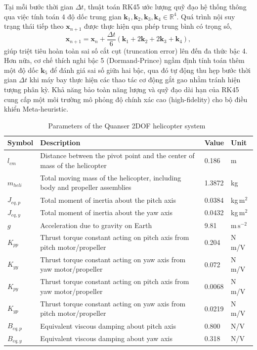\documentclass[conference, a4paper]{IEEEtran}
\begin{document}
Tại mỗi bước thời gian $\Delta t$, thuật toán RK45 ước lượng quỹ đạo hệ thống thông qua việc tính toán 4 độ dốc trung gian $\mathbf{k}_1, \mathbf{k}_2, \mathbf{k}_3, \mathbf{k}_4 \in \mathbb{R}^4$. Quá trình nội suy trạng thái tiếp theo $\mathbf{x}_{n+1}$ được thực hiện qua phép trung bình có trọng số,
\begin{equation}
\mathbf{x}_{n+1} = \mathbf{x}_n + \frac{\Delta t}{6} (\mathbf{k}_1 + 2\mathbf{k}_2 + 2\mathbf{k}_3 + \mathbf{k}_4),
\end{equation}
giúp triệt tiêu hoàn toàn sai số cắt cụt (truncation error) lên đến đa thức bậc 4. Hơn nữa, cơ chế thích nghi bậc 5 (Dormand-Prince) ngầm định tính toán thêm một độ dốc $\mathbf{k}_5$ để đánh giá sai số giữa hai bậc, qua đó tự động thu hẹp bước thời gian $\Delta t$ khi máy bay thực hiện các thao tác cơ động gắt gao nhằm tránh hiện tượng phân kỳ. Khả năng bảo toàn năng lượng và quỹ đạo dài hạn của RK45 cung cấp một môi trường mô phỏng độ chính xác cao (high-fidelity) cho bộ điều khiển Meta-heuristic.

\begin{table}[h!]
\caption{Parameters of the Quanser 2DOF helicopter system~\cite{apkarian2012user}}
\label{tab:quanser-2dof-system-parameters}
\centering
\small
\begin{tabular}{p{}p{}p{}p{}}
\toprule
Symbol & Description & Value & Unit \\
\midrule
$l_{cm}$ & Distance between the pivot point and the center of mass of the helicopter & 0.186 & m \\
$m_{heli}$ & Total moving mass of the helicopter, including body and propeller assemblies & 1.3872 & kg \\
$J_{eq,p}$ & Total moment of inertia about the pitch axis & 0.0384 & kg\,$\mathrm{m}^{2}$ \\
$J_{eq,y}$ & Total moment of inertia about the yaw axis & 0.0432 & kg\,$\mathrm{m}^{2}$ \\
$g$ & Acceleration due to gravity on Earth & 9.81 & m\,$\mathrm{s}^{-2}$ \\
$K_{pp}$ & Thrust torque constant acting on pitch axis from pitch motor/propeller & 0.204 & N\,m/V \\
$K_{yy}$ & Thrust torque constant acting on yaw axis from yaw motor/propeller & 0.072 & N\,m/V \\
$K_{py}$ & Thrust torque constant acting on pitch axis from yaw motor/propeller & 0.0068 & N\,m/V \\
$K_{yp}$ & Thrust torque constant acting on yaw axis from pitch motor/propeller & 0.0219 & N\,m/V \\
$B_{eq,p}$ & Equivalent viscous damping about pitch axis & 0.800 & N/V \\
$B_{eq,y}$ & Equivalent viscous damping about yaw axis & 0.318 & N/V \\
\bottomrule
\end{tabular}
\end{table}
\end{document}
